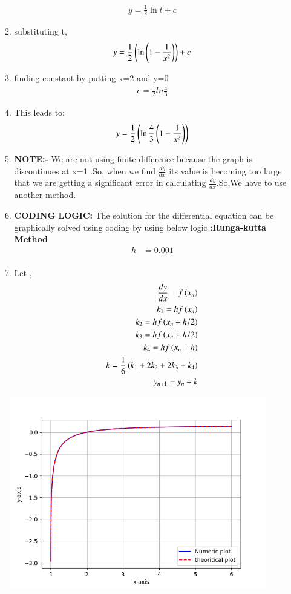 \documentclass[journal]{IEEEtran}
\begin{document}
\begin{enumerate}
\begin{enumerate}
\begin{align}
    y = \frac{1}{2}\ln{t} + c
    \end{align}
    \item substituting t,
    \begin{align}
    y = \frac{1}{2}\left(\ln{\ensuremath{\left(1-\frac{1}{x^2}\right)}}\right) + c
    \end{align} 
    \item finding constant by putting x=2 and y=0
    \begin{align}
    c = \frac{1}{2}ln{\frac{4}{3}}
    \end{align} 
    \item This leads to:
    \begin{align}
    y = \frac{1}{2}\left(\ln{\frac{4}{3}\ensuremath{\left(1-\frac{1}{x^2}\right)}}\right)
    \end{align}
    \item \textbf{NOTE:-} We are not using finite difference because the graph is discontinues at x=1 .So, when we find $\frac{dy}{dx}$ its value is becoming too large that we are getting a significant error in calculating $\frac{dy}{dx}$.So,We have to use another method.
    \item \textbf{CODING LOGIC:} The solution for the differential equation can be graphically solved using coding by using below logic :\textbf{Runga-kutta Method}
\begin{align} 
	h&=0.001 \\
\end{align}
\item Let ,
\begin{align} 
	\frac{dy}{dx} = f\left(x_n\right) \\
	k_1 = hf\left(x_n\right)\\
	k_2 = hf\left(x_n + h/2\right)\\
	k_3 = hf\left(x_n + h/2\right)\\
	k_4 = hf\left(x_n + h\right)\\
	k = \frac{1}{6}\left(k_1 + 2k_2 + 2k_3+k_4\right)\\
	y_{n+1} = y_n + k
\end{align}
\end{enumerate}

\end{enumerate}

\begin{figure}[h!]
   \centering
   \includegraphics[width=0.7\linewidth]{figs/Figure_1.png}
\end{figure}
\end{document}
